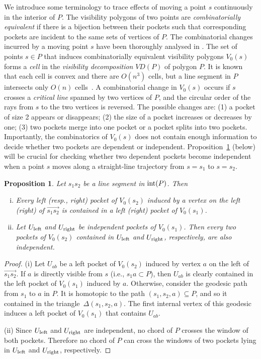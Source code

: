 \documentclass[12pt]{article}
\newtheorem{proposition}{Proposition}
\begin{document}
We introduce some terminology to trace effects of moving a point $s$ continuously in the interior of $P$.
The visibility polygons of two points are \emph{combinatorially equivalent} if there is a bijection between their pockets such that corresponding pockets are incident to the same sets of vertices of $P$.
The combinatorial changes incurred by a moving point $s$ have been thoroughly analysed in \cite{AGTZ02,BLM02,CW12}.
The set of points $s\in P$ that induces combinatorially equivalent visibility polygons $V_0(s)$ forms a \emph{cell} in the \emph{visibility decomposition} $VD(P)$ of polygon $P$. It is known that each cell is convex and there are $O(n^3)$ cells, but a line segment in $P$ intersects only $O(n)$ cells~\cite{BLM02,CD98}.
A combinatorial change in $V_0(s)$ occurs if $s$ crosses a \emph{critical line} spanned by two vertices of $P$, and the circular order of the rays from $s$ to the two vertices is reversed.
The possible changes are: (1) a pocket of size 2 appears or disappears; (2) the size of a pocket increases or decreases by one; (3) two pockets merge into one pocket or a pocket splits into two pockets.
Importantly, the combinatorics of $V_0(s)$ does not contain enough information to decide whether two pockets are dependent or independent. Proposition~\ref{prop:sliding-pockets} (below) will be crucial for checking whether two dependent pockets become independent when a point $s$ moves along a straight-line trajectory from $s=s_1$ to $s=s_2$.


\begin{proposition} \label{prop:sliding-pockets}
Let $s_1s_2$ be a line segment in ${\rm int}(P)$. Then
\begin{enumerate}[(i)]
\item Every left (resp., right) pocket of $V_0(s_2)$ induced by a
vertex on the left (right) of $\overrightarrow{s_1s_2}$
is contained in a left (right) pocket of $V_0(s_1)$.
\item Let $U_{\rm left}$ and $U_{\rm right}$ be independent pockets of $V_0(s_1)$.
Then every two pockets of $V_0(s_2)$ contained in $U_{\rm left}$ and $U_{\rm right}$, respectively, are also independent.
\end{enumerate}
\end{proposition}

\begin{proof}
(i) Let $U_{ab}$ be a left pocket of $V_0(s_2)$ induced by vertex $a$ on the left of $\overrightarrow{s_1s_2}$. If $a$ is directly visible from $s$ (i.e., $s_1a\subset P$),
then $U_{ab}$ is clearly contained in the left pocket of $V_0(s_1)$ induced by $a$.
Otherwise, consider the geodesic path from $s_1$ to $a$ in $P$. It is homotopic to the path $(s_1,s_2,a)\subseteq P$, and so it contained in the triangle~$\Delta(s_1,s_2,a)$. The first
internal vertex of this geodesic induces a left pocket of $V_0(s_1)$ that contains $U_{ab}$.

(ii) Since $U_{\rm left}$ and $U_{\rm right}$ are independent, no chord of $P$ crosses the window of both pockets. Therefore no chord of $P$ can cross the windows of two pockets lying in
$U_{\rm left}$ and $U_{\rm right}$, respectively.
\end{proof}
\end{document}
